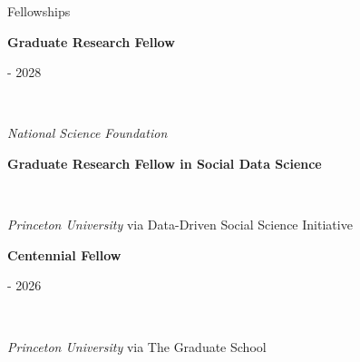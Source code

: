\documentclass{cv} %
\begin{document}

\begin{cvSection}{Fellowships}

\begin{minipage}[t]{0.50\linewidth}
    \raggedright \textbf{Graduate Research Fellow}%
\end{minipage}
\hfill
\begin{minipage}[t]{0.45\linewidth}
     - 2028%
\end{minipage}
\\
\begin{minipage}[t]{0.70\linewidth}
    \raggedright \textit{National Science Foundation}%
\end{minipage}
\hfill
\begin{minipage}[t]{0.25\linewidth}
\end{minipage}

\begin{minipage}[t]{0.70\linewidth}
    \raggedright \textbf{Graduate Research Fellow in Social Data Science}%
\end{minipage}
\hfill
\begin{minipage}[t]{0.25\linewidth}
\end{minipage}
\\
\begin{minipage}[t]{0.70\linewidth}
    \raggedright \textit{Princeton University} via Data-Driven Social Science Initiative%
\end{minipage}
\hfill
\begin{minipage}[t]{0.25\linewidth}
\end{minipage}

\begin{minipage}[t]{0.70\linewidth}
    \raggedright \textbf{Centennial Fellow}%
\end{minipage}
\hfill
\begin{minipage}[t]{0.25\linewidth}
     - 2026%
\end{minipage}
\\
\begin{minipage}[t]{0.70\linewidth}
    \raggedright \textit{Princeton University} via The Graduate School%
\end{minipage}
\hfill
\begin{minipage}[t]{0.25\linewidth}
\end{minipage}


\end{cvSection}
\end{document}
